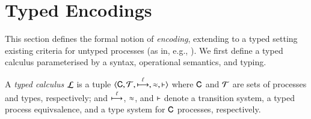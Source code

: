 
\section{Typed Encodings}\label{s:expr}
This section defines the formal notion of \emph{encoding}, 
extending to a typed setting existing criteria for untyped processes (as in, e.g.,
\cite{Nestmann00,Palamidessi03,DBLP:conf/lics/PalamidessiSVV06,DBLP:journals/iandc/Gorla10,DBLP:conf/icalp/LanesePSS10}). 
We first define a typed calculus parameterised by a syntax, operational semantics, and typing.



\begin{definition}\label{d:tcalculus}\rm
	A \emph{typed calculus} $\mathcal{L}$ is a tuple
          $\langle \mathsf{C}, \cal{T}, \stackrel{\ell}{\longmapsto}, \approx, \vdash \rangle$
	where $\mathsf{C}$ and $\cal{T}$ are sets of processes and types, 
respectively; and $\stackrel{\ell}{\longmapsto}$, $\approx$, and $\vdash$ 
	denote a transition system, a typed process equivsalence, and a type system for $\mathsf{C}$ processes, respectively. 
\end{definition}





%

